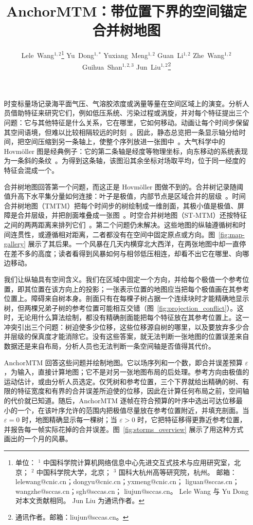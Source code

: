 \documentclass[preprint]{vgtc_zh}   %
\title{AnchorMTM：带位置下界的空间锚定合并树地图}
\author{%
Lele~Wang$^{1,2}$\thanks{%
单位：
$^{1}$ 中国科学院计算机网络信息中心先进交互式技术与应用研究室，北京；
$^{2}$ 中国科学院大学，北京；
$^{3}$ 国科大杭州高等研究院，杭州。
邮箱：lelewang@cnic.cn；dongyu@cnic.cn；yxmeng@cnic.cn；
liguan@sccas.cn；wangzhe@sccas.cn；sgh@sccas.cn；
liujun@sccas.cn。
Lele Wang 与 Yu Dong 对本文贡献相同。
Jun Liu 为通讯作者。}%
\quad
Yu~Dong$^{1,*}$%
\quad
Yuxiang~Meng$^{1,2}$%
\quad
Guan~Li$^{1,2}$%
\quad
Zhe~Wang$^{1,2}$%
\quad
Guihua~Shan$^{1,2,3}$%
\quad
Jun~Liu$^{1,2}$\thanks{通讯作者。邮箱：liujun@sccas.cn。}
}
\begin{document}
\maketitle
\raggedbottom
\setlength{\emergencystretch}{1.5em}
时变标量场记录海平面气压、气溶胶浓度或涡量等量在空间区域上的演变。分析人员借助特征来研究它们，例如低压系统、污染过程或涡旋，并对每个特征提出三个问题：它与其他特征是什么关系，它在哪里，它如何移动。动画让每个时间步保留其空间语境，但难以比较相隔较远的时刻~\cite{Tversky:2002:Animation,Robertson:2008:Animation}。因此，静态总览把一条显示轴分给时间，把空间压缩到另一条轴上，使整个序列放进一张图中~\cite{Bach:2017:STC}。大气科学中的 Hovm\"oller 图是经典例子：它的第二条轴是经度等物理坐标，向东移动的系统表现为一条斜的条纹~\cite{Hovmoller:1949}。为得到这条轴，该图沿其余坐标对场取平均，位于同一经度的特征会混成一个。

合并树地图回答第一个问题，而这正是 Hovm\"oller 图做不到的。合并树记录随阈值升高下水平集分量如何连接：叶子是极值，内部节点是区域合并的层级~\cite{Heine:2016:Survey}。时间合并树地图（TMTM）把每个时间步的树绘制成一维剖面，其极小值是极值、屏障是合并层级，并把剖面堆叠成一张图~\cite{Koepp:2023:TMTM}。时空合并树地图（ST-MTM）还按特征之间的两两距离来排列它们~\cite{STMTM:2026}。第二个问题仍未解决。这些地图的纵轴遵循树和时间连贯性，或遵循相对距离，二者都没有在空间中固定原点或方向。图~\ref{fig:map-gallery} 展示了其后果。一个风暴在几天内横穿北大西洋，在两张地图中却一直停在差不多的高度；读者看得到风暴如何与相邻低压相连，却看不出它在哪里、向哪边移动。

我们让纵轴具有空间含义。我们在区域中固定一个方向，并给每个极值一个参考位置，即其位置在该方向上的投影；一张表示位置的地图应当把每个极值画在其参考位置上。障碍来自树本身。剖面只有在每棵子树占据一个连续块时才能精确地显示树，但两棵兄弟子树的参考位置可能相互交错（图~\ref{fig:projection_conflict}）。这时，无论用什么算法绘制，都没有精确剖面能把每个特征放在其参考位置上。这一冲突引出三个问题：树迫使多少位移，这些位移源自树的哪里，以及要放弃多少合并层级的保真度才能消除它。没有这些答案，就无法判断一张地图的位置误差来自数据还是来自布局，分析人员也无法判断一条空间轴是否值得其代价。

AnchorMTM 回答这些问题并绘制地图。它以场序列和一个数，即合并误差预算 $\varepsilon$，为输入，直接计算地图；它不是对另一张地图布局的后处理。参考方向由极值的运动估计，或由分析人员选定。仅凭树和参考位置，三个下界就给出精确的树、有限的特征宽度和有界的合并误差所迫使的位移，因此在计算任何布局之前，空间轴的代价就已知道。随后，AnchorMTM 逐帧在符合预算的叶序中选出可达位移最小的一个，在该叶序允许的范围内把极值尽量放在参考位置附近，并填充剖面。当 $\varepsilon=0$ 时，地图精确显示每一棵树；当 $\varepsilon>0$ 时，它把特征移得更靠近参考位置，并报告每一帧实际花掉的合并误差。图~\ref{fig:storms_overview} 展示了用这种方式画出的一个月的风暴。
\end{document}
